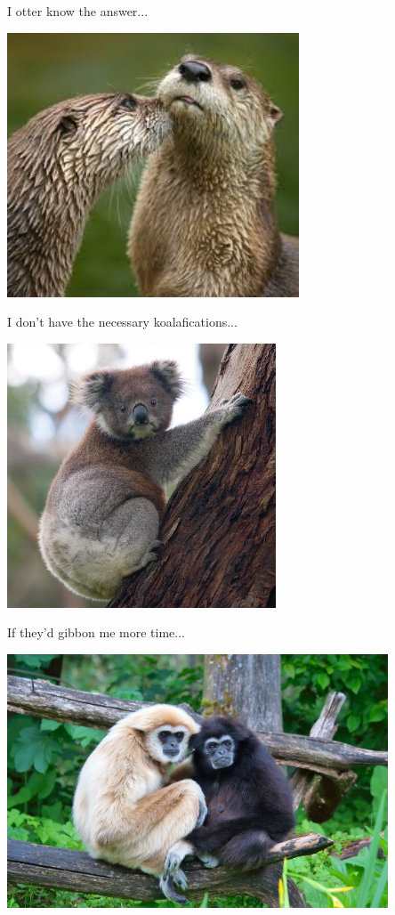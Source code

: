 \documentclass[10pt, xcolor=table]{beamer}
\theoremstyle{definition}
\theoremstyle{remark}
\begin{document}
\begin{frame}{I otter know the answer...}
  \begin{center}
\includegraphics[width=0.65\textwidth]{figures/otter}
\end{center}
\end{frame}

\begin{frame}{I don't have the necessary koalafications...}
  \begin{center}
\includegraphics[width=0.6\textwidth]{figures/koala}
\end{center}
\end{frame}

\begin{frame}{If they'd gibbon me more time...}
  \begin{center}
\includegraphics[width=0.85\textwidth]{figures/gibbon}
\end{center}
\end{frame}
\end{document}
